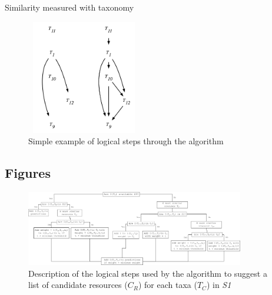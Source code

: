 \documentclass[letterpaper]{article}
\begin{document}
    \centerline{Similarity measured with taxonomy}

    \begin{figure}[h!]
    \centering\includegraphics[height = 5cm, width = 5cm]{example.pdf}
    \caption{Simple example of logical steps through the algorithm}
    \label{fig:example}
    \end{figure}

\newpage
\subsection{Figures}
    \begin{figure}[h]
      \centering\includegraphics[width=0.85\textwidth]{Decision_Diagram.png}
      \caption{Description of the logical steps used by the algorithm to suggest a list of candidate resources ($C_R$) for each taxa ($T_C$) in \textit{S1}}
      \label{fig:decision_diag}
    \end{figure}
\end{document}
